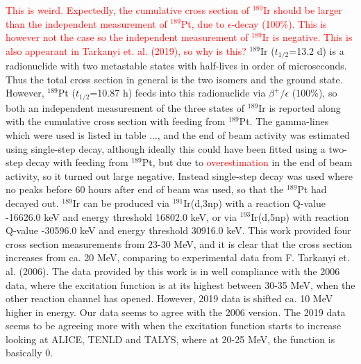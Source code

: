 \subsubsection{}
\textcolor{red}{This is weird. Expectedly, the cumulative cross section of $^{189}$Ir should be larger than the independent measurement of $^{189}$Pt, due to $\epsilon$-decay (100\%). This is however not the case so the independent measurement of $^{189}$Ir is negative. This is also appearant in Tarkanyi et. al. (2019), so why is this?}
$^{189}$Ir ($t_{1/2}$=13.2 d) is a radionuclide with two metastable states with half-lives in order of microseconds. Thus the total cross section in general is the two isomers and the ground state. However, $^{189}$Pt ($t_{1/2}$=10.87 h) feeds into this radionuclide via $\beta^+/\epsilon$ (100\%), so both an independent measurement of the three states of $^{189}$Ir is reported along with the cumulative cross section with feeding from $^{189}$Pt. The gamma-lines which were used is listed in table ..., and the end of beam activity was estimated using single-step decay, although ideally this could have been fitted using a two-step decay with feeding from $^{189}$Pt, but due to \textcolor{red}{overestimation} in the end of beam activity, so it turned out large negative. Instead single-step decay was used where no peaks before 60 hours after end of beam was used, so that the $^{189}$Pt had decayed out.  
$^{189}$Ir can be produced via $^{191}$Ir(d,3np) with a reaction Q-value -16626.0 keV and energy threshold 16802.0 keV, or via $^{193}$Ir(d,5np) with reaction Q-value -30596.0 keV and energy threshold 30916.0 keV. This work provided four cross section measurements from 23-30 MeV, and it is clear that the cross section increases from ca. 20 MeV, comparing to experimental data from F. Tarkanyi et. al. (2006). The data provided by this work is in well compliance with the 2006 data, where the excitation function is at its highest between 30-35 MeV, when the other reaction channel has opened. However, 2019 data is shifted ca. 10 MeV higher in energy. Our data seems to agree with the 2006 version.  The 2019 data seems to be agreeing more with when the excitation function starts to increase looking at ALICE, TENLD and TALYS, where at 20-25 MeV, the function is basically 0. 



